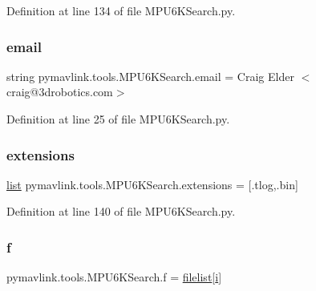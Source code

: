 Definition at line 134 of file M\+P\+U6\+K\+Search.\+py.

\mbox{\label{namespacepymavlink_1_1tools_1_1MPU6KSearch_addf5782d97897730d0cb3b7410787906}} 
\subsubsection{\texorpdfstring{email}{email}}
{\footnotesize\ttfamily string pymavlink.\+tools.\+M\+P\+U6\+K\+Search.\+email = \textquotesingle{}Craig Elder $<$craig@3drobotics.\+com$>$\textquotesingle{}}



Definition at line 25 of file M\+P\+U6\+K\+Search.\+py.

\mbox{\label{namespacepymavlink_1_1tools_1_1MPU6KSearch_ab42858fbaf5e3782f567e13183d9ea07}} 
\subsubsection{\texorpdfstring{extensions}{extensions}}
{\footnotesize\ttfamily \mbox{\hyperlink{structlist}{list}} pymavlink.\+tools.\+M\+P\+U6\+K\+Search.\+extensions = \mbox{[}\textquotesingle{}.tlog\textquotesingle{},\textquotesingle{}.bin\textquotesingle{}\mbox{]}}



Definition at line 140 of file M\+P\+U6\+K\+Search.\+py.

\mbox{\label{namespacepymavlink_1_1tools_1_1MPU6KSearch_ac07a87a94d378396fc6958ca6fcb3064}} 
\subsubsection{\texorpdfstring{f}{f}}
{\footnotesize\ttfamily pymavlink.\+tools.\+M\+P\+U6\+K\+Search.\+f = \mbox{\hyperlink{namespacepymavlink_1_1tools_1_1MPU6KSearch_aca86a704134fd3da4bb5925d74832d36}{filelist}}\mbox{[}\mbox{\hyperlink{velTest_8cpp_a1239420b8759f52cbab64225b82461e2}{i}}\mbox{]}}



